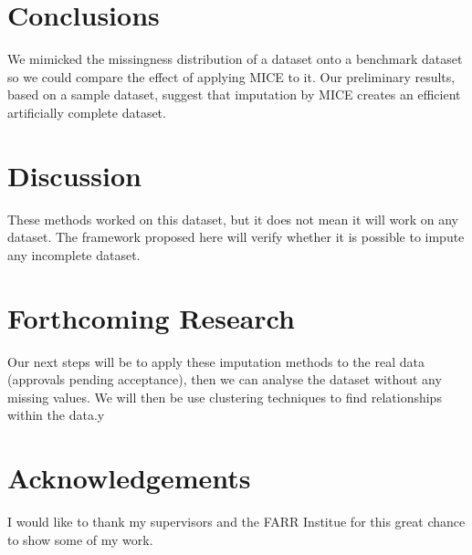 \documentclass[a0,portrait]{a0poster}
\begin{document}
\begin{multicols}{2}

\color{SaddleBrown} %

\section*{Conclusions}
We mimicked the missingness distribution of a dataset onto a benchmark dataset so we could compare the effect of applying MICE to it. Our preliminary results, based on a sample dataset, suggest that imputation by MICE creates an efficient artificially complete dataset. 


\color{Navy}
\section*{Discussion}
These methods worked on this dataset, but it does not mean it will work on any dataset. The framework proposed here will verify whether it is possible to impute any incomplete dataset.

\color{DarkSlateGray} %

\section*{Forthcoming Research}
Our next steps will be to apply these imputation methods to the real data (approvals pending acceptance), then we can analyse the dataset without any missing values. We will then be use clustering techniques to find relationships within the data.y




\section*{Acknowledgements}
I would like to thank my supervisors and the FARR Institue for this great chance to show some of my work.



\end{multicols}
\end{document}
